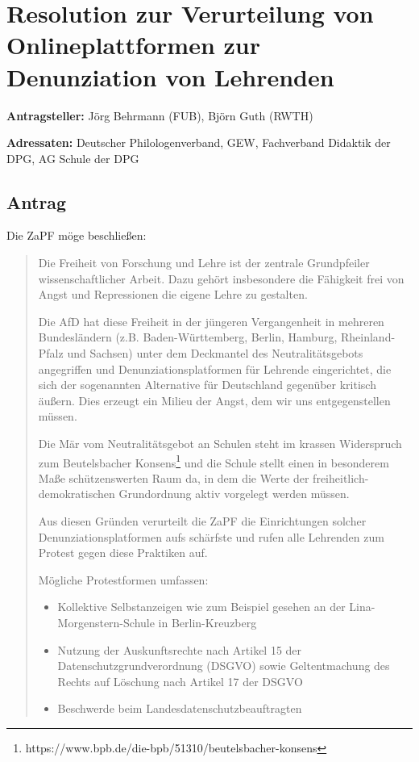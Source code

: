 \documentclass[draft,10pt,oneside]{scrartcl}
\begin{document}
\section*{Resolution zur Verurteilung von Onlineplattformen zur Denunziation
von Lehrenden}

\textbf{Antragsteller:} Jörg Behrmann (FUB), Björn Guth (RWTH)

\textbf{Adressaten:} Deutscher Philologenverband, GEW, Fachverband Didaktik der
DPG, AG Schule der DPG

\subsection*{Antrag}

Die ZaPF möge beschließen:

\begin{quote} Die Freiheit von Forschung und Lehre ist der zentrale
    Grundpfeiler wissenschaftlicher Arbeit. Dazu gehört insbesondere die
    Fähigkeit frei von Angst und Repressionen die eigene Lehre zu gestalten.

    Die AfD hat diese Freiheit in der jüngeren Vergangenheit in mehreren
    Bundesländern (z.B. Ba\-den-\allowbreak Würt\-tem\-berg, Berlin, Hamburg,
    Rheinland-Pfalz und Sachsen) unter dem Deckmantel des Neutralitätsgebots
    angegriffen und Denunziationsplatformen für Lehrende eingerichtet, die sich
    der sogenannten \glqq{}Alternative für Deutschland\grqq{} gegenüber
    kritisch äußern. Dies erzeugt ein Milieu der Angst, dem wir uns
    entgegenstellen müssen.

    Die Mär vom Neutralitätsgebot an Schulen steht im krassen Widerspruch zum
    Beutelsbacher
    Konsens\footnote{https://www.bpb.de/die-bpb/51310/beutelsbacher-konsens}
    und die Schule stellt einen in besonderem Maße schützenswerten Raum da, in
    dem die Werte der freiheitlich-demokratischen Grundordnung aktiv vorgelegt
    werden müssen.

    Aus diesen Gründen verurteilt die ZaPF die Einrichtungen solcher
    Denunziationsplatformen aufs schärfste und rufen alle Lehrenden zum Protest
    gegen diese Praktiken auf.

    Mögliche Protestformen umfassen:

    \begin{itemize}
        \item Kollektive Selbstanzeigen wie zum Beispiel gesehen an der
            Lina-\allowbreak Morgenstern-\allowbreak Schule in
            Ber\-lin-\allowbreak Kreuz\-berg
        \item Nutzung der Auskunftsrechte nach Artikel 15 der
            Datenschutzgrundverordnung (DSGVO) sowie Geltentmachung des Rechts
            auf Löschung nach Artikel 17 der DSGVO
        \item Beschwerde beim Landesdatenschutzbeauftragten
    \end{itemize}
\end{quote}
\end{document}
